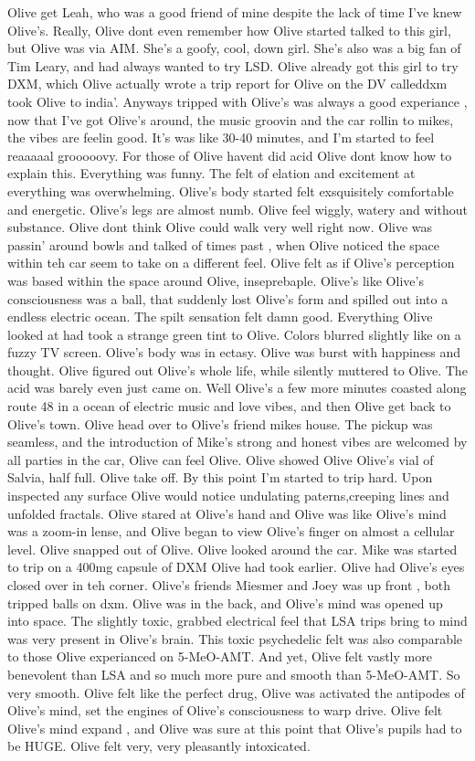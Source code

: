 \documentclass[12pt]{book}
\begin{document}
Olive get Leah, who was a good friend of mine despite the lack of time I've knew Olive's. Really, Olive dont even remember how Olive started talked to this girl, but Olive was via AIM. She's a goofy, cool, down girl. She's also was a big fan of Tim Leary, and had always wanted to try LSD. Olive already got this girl to try DXM, which Olive actually wrote a trip report for Olive on the DV calleddxm took Olive to india'. Anyways tripped with Olive's was always a good experiance , now that I've got Olive's around, the music groovin and the car rollin to mikes, the vibes are feelin good. It's was like 30-40 minutes, and I'm started to feel reaaaaal grooooovy. For those of Olive havent did acid Olive dont know how to explain this. Everything was funny. The felt of elation and excitement at everything was overwhelming. Olive's body started felt exsquisitely comfortable and energetic. Olive's legs are almost numb. Olive feel wiggly, watery and without substance. Olive dont think Olive could walk very well right now. Olive was passin' around bowls and talked of times past , when Olive noticed the space within teh car seem to take on a different feel. Olive felt as if Olive's perception was based within the space around Olive, inseprebaple. Olive's like Olive's consciousness was a ball, that suddenly lost Olive's form and spilled out into a endless electric ocean. The spilt sensation felt damn good. Everything Olive looked at had took a strange green tint to Olive. Colors blurred slightly like on a fuzzy TV screen. Olive's body was in ectasy. Olive was burst with happiness and thought. Olive figured out Olive's whole life, while silently muttered to Olive. The acid was barely even just came on. Well Olive's a few more minutes coasted along route 48 in a ocean of electric music and love vibes, and then Olive get back to Olive's town. Olive head over to Olive's friend mikes house. The pickup was seamless, and the introduction of Mike's strong and honest vibes are welcomed by all parties in the car, Olive can feel Olive. Olive showed Olive Olive's vial of Salvia, half full. Olive take off. By this point I'm started to trip hard. Upon inspected any surface Olive would notice undulating paterns,creeping lines and unfolded fractals. Olive stared at Olive's hand and Olive was like Olive's mind was a zoom-in lense, and Olive began to view Olive's finger on almost a cellular level. Olive snapped out of Olive. Olive looked around the car. Mike was started to trip on a 400mg capsule of DXM Olive had took earlier. Olive had Olive's eyes closed over in teh corner. Olive's friends Miesmer and Joey was up front , both tripped balls on dxm. Olive was in the back, and Olive's mind was opened up into space. The slightly toxic, grabbed electrical feel that LSA trips bring to mind was very present in Olive's brain. This toxic psychedelic felt was also comparable to those Olive experianced on 5-MeO-AMT. And yet, Olive felt vastly more benevolent than LSA and so much more pure and smooth than 5-MeO-AMT. So very smooth. Olive felt like the perfect drug, Olive was activated the antipodes of Olive's mind, set the engines of Olive's consciousness to warp drive. Olive felt Olive's mind expand , and Olive was sure at this point that Olive's pupils had to be HUGE. Olive felt very, very pleasantly intoxicated. 
\end{document}
